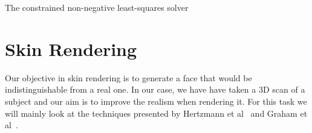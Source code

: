\documentclass[11pt]{report}
\begin{document}
The constrained non-negative least-squares solver 









\section{Skin Rendering}

Our objective in skin rendering is to generate a face that would be indistinguishable from a real one.
In our case, we have have taken a 3D scan of a subject and our aim is to improve the realism when rendering it.
For this task we will mainly look at the techniques presented by Hertzmann et al~\cite{Hertzmann2001} and Graham et al~\cite{Graham2013}.
\end{document}
